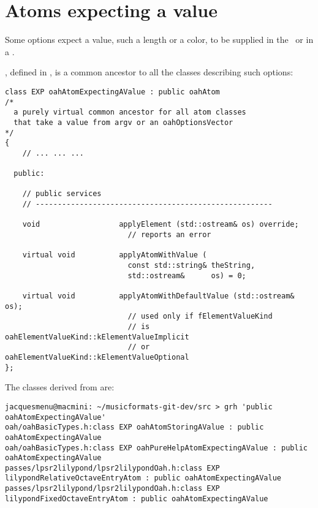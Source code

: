 \section{Atoms expecting a value}

Some options expect a value, such a length or a color, to be supplied in the \CLI\ or in a .

, defined in , is a common ancestor to all the classes describing such options:
\begin{lstlisting}[language=CPlusPlus]
class EXP oahAtomExpectingAValue : public oahAtom
/*
  a purely virtual common ancestor for all atom classes
  that take a value from argv or an oahOptionsVector
*/
{
	// ... ... ...

  public:

    // public services
    // ------------------------------------------------------

    void                  applyElement (std::ostream& os) override;
                            // reports an error

    virtual void          applyAtomWithValue (
                            const std::string& theString,
                            std::ostream&      os) = 0;

    virtual void          applyAtomWithDefaultValue (std::ostream& os);
                            // used only if fElementValueKind
                            // is oahElementValueKind::kElementValueImplicit
                            // or oahElementValueKind::kElementValueOptional
};
\end{lstlisting}

The classes derived from  are:
\begin{lstlisting}[language=Terminal]
jacquesmenu@macmini: ~/musicformats-git-dev/src > grh 'public oahAtomExpectingAValue'
oah/oahBasicTypes.h:class EXP oahAtomStoringAValue : public oahAtomExpectingAValue
oah/oahBasicTypes.h:class EXP oahPureHelpAtomExpectingAValue : public oahAtomExpectingAValue
passes/lpsr2lilypond/lpsr2lilypondOah.h:class EXP lilypondRelativeOctaveEntryAtom : public oahAtomExpectingAValue
passes/lpsr2lilypond/lpsr2lilypondOah.h:class EXP lilypondFixedOctaveEntryAtom : public oahAtomExpectingAValue
\end{lstlisting}


